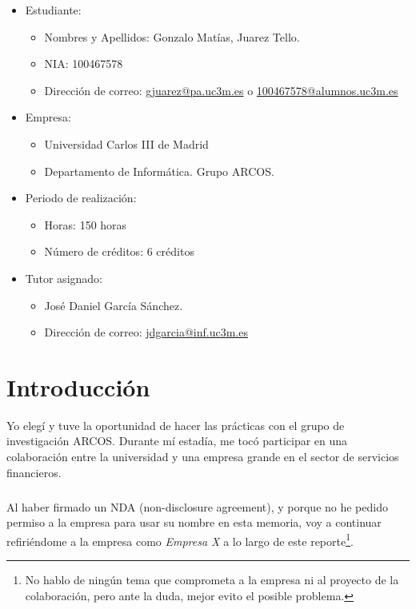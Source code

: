 \documentclass[12pt]{extreport} %
\begin{document}
\begin{itemize}
\item Estudiante:
  \begin{itemize}
  \item Nombres y Apellidos: Gonzalo Matías, Juarez Tello.
  \item NIA: 100467578
  \item Dirección de correo: \url{gjuarez@pa.uc3m.es} o \url{100467578@alumnos.uc3m.es}
  \end{itemize}

\item Empresa:
  \begin{itemize}
  \item Universidad Carlos III de Madrid
  \item Departamento de Informática. Grupo ARCOS.
  \end{itemize}

\item Periodo de realización:
  \begin{itemize}
  \item Horas: 150 horas
  \item Número de créditos: 6 créditos
  \end{itemize}

\item Tutor asignado:
  \begin{itemize}
  \item José Daniel García Sánchez.
  \item Dirección de correo: \url{jdgarcia@inf.uc3m.es}
  \end{itemize}
\end{itemize}

\chapter{Introducción}

Yo elegí y tuve la oportunidad de hacer las prácticas con el grupo de
investigación ARCOS. Durante mí estadía, me tocó participar en una
colaboración entre la universidad y una empresa grande en el sector de
servicios financieros.


\paragraph{}
Al haber firmado un NDA (non-disclosure agreement), y porque no he
pedido permiso a la empresa para usar su nombre en esta memoria, voy a
continuar refiriéndome a la empresa como \emph{Empresa X} a lo largo
de este reporte\footnote{No hablo de ningún tema que comprometa a la
empresa ni al proyecto de la colaboración, pero ante la duda, mejor
evito el posible problema.}.
\end{document}
